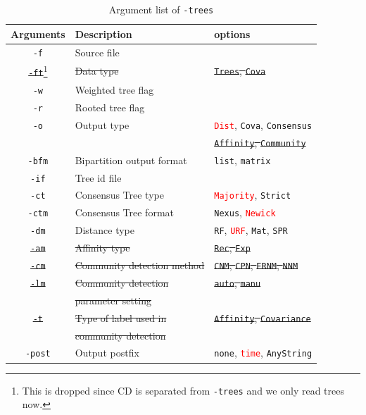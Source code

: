 \documentclass[11pt,a4paper]{article}
\theoremstyle{definition}
\theoremstyle{definition}
\numberwithin{equation}{section}
\begin{document}
	\begin{table}[!h]
		\centering
		\begin{tabular}{cll}
			\hline
			Arguments & Description & options\\
			\hline
			\texttt{-f}& Source file &  \\
			\hline
			\st{\texttt{-ft}}\footnote{This is dropped since CD is separated from \texttt{-trees} and we only read trees now.}& \st{Data type} & \st{\texttt{Trees}, \texttt{Cova}}\\
			\hline
			\texttt{-w}& Weighted tree flag&\\
			\hline
			\texttt{-r}& Rooted tree flag& \\
			\hline
			\texttt{-o}& Output type & \textcolor{red}{\texttt{Dist}}, \texttt{Cova}, \texttt{Consensus}\\
			&&\st{\texttt{Affinity}, \texttt{Community}}\\
			\hline
			\texttt{-bfm}& Bipartition output format & \texttt{list}, \texttt{matrix}\\
			\hline
			\texttt{-if}& Tree id file&\\
			\hline
			\texttt{-ct}& Consensus Tree type& \textcolor{red}{\texttt{Majority}}, \texttt{Strict}\\
			\hline
			\texttt{-ctm}& Consensus Tree format& \texttt{Nexus}, \textcolor{red}{\texttt{Newick}}\\
			\hline
			\texttt{-dm}& Distance type& \texttt{RF}, \textcolor{red}{\texttt{URF}}, \texttt{Mat}, \texttt{SPR}\\
			\hline
			\st{\texttt{-am}}& \st{Affinity type}& \st{\texttt{Rec}, \texttt{Exp}}\\
			\hline
			\st{\texttt{-cm}}& \st{Community detection method}& \st{\texttt{CNM}, \texttt{CPN}, \texttt{ERNM}, \texttt{NNM}}\\
			\hline
			\st{\texttt{-lm}}& \st{Community detection} & \st{\texttt{auto}, \texttt{manu}}\\
			& \st{parameter setting}&\\
			\hline
			\st{\texttt{-t}}& \st{Type of label used in} & \st{\texttt{Affinity}, \texttt{Covariance}}\\
			& \st{community detection}&\\
			\hline
			\texttt{-post} & Output postfix&\texttt{none}, \textcolor{red}{\texttt{time}}, \texttt{AnyString}\\
			\hline
		\end{tabular}
		\caption{Argument list of \texttt{-trees}}
		\label{tab:treeslist}
	\end{table}
	
\end{document}
